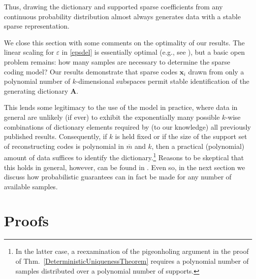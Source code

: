 \documentclass[journal, twocolumn]{IEEEtran}
\begin{document}
Thus, drawing the dictionary and supported sparse coefficients from any continuous probability distribution almost always generates data with a stable sparse representation.


We close this section with some comments on the optimality of our results.  The linear scaling for $\varepsilon$ in \eqref{epsdel} is essentially optimal (e.g., see \cite{arias2013fundamental}), but a basic open problem remains: how many samples are necessary to determine the sparse coding model? Our results demonstrate that sparse codes $\mathbf{x}_i$ drawn from only a polynomial number of $k$-dimensional subspaces permit stable identification of the generating dictionary $\mathbf{A}$. 

This lends some legitimacy to the use of the model in practice, where data in general are unlikely (if ever) to exhibit the exponentially many possible $k$-wise combinations of dictionary elements required by (to our knowledge) all previously published results. Consequently, if $k$ is held fixed or if the size of the support set of reconstructing codes is polynomial in $\overline m$ and $k$, then a practical (polynomial) amount of data suffices to identify the dictionary.\footnote{In the latter case, a reexamination of the pigeonholing argument in the proof of Thm.~\ref{DeterministicUniquenessTheorem} requires a polynomial number of samples distributed over a polynomial number of supports.} Reasons to be skeptical that this holds in general, however, can be found in \cite{tillmann2014computational, Tillmann15}. Even so, in the next section we discuss how probabilistic guarantees can in fact be made for any number of available samples.

\section{Proofs}\label{DUT} %
\end{document}

